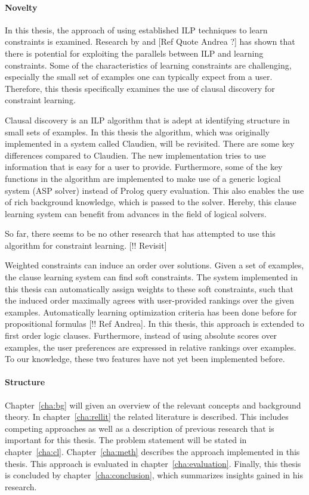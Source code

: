\paragraph{Novelty}
In this thesis, the approach of using established ILP techniques to learn constraints is examined. Research by \cite{Lallouet:LearningCP} and [Ref Quote Andrea ?] has shown that there is potential for exploiting the parallels between ILP and learning constraints. Some of the characteristics of learning constraints are challenging, especially the small set of examples one can typically expect from a user. Therefore, this thesis specifically examines the use of clausal discovery for constraint learning.

Clausal discovery is an ILP algorithm that is adept at identifying structure in small sets of examples. In this thesis the algorithm, which was originally implemented in a system called Claudien, will be revisited. There are some key differences compared to Claudien. The new implementation tries to use information that is easy for a user to provide. Furthermore, some of the key functions in the algorithm are implemented to make use of a generic logical system (ASP solver) instead of Prolog query evaluation. This also enables the use of rich background knowledge, which is passed to the solver. Hereby, this clause learning system can benefit from advances in the field of logical solvers.

So far, there seems to be no other research that has attempted to use this algorithm for constraint learning. [!! Revisit]

Weighted constraints can induce an order over solutions. Given a set of examples, the clause learning system can find soft constraints. The system implemented in this thesis can automatically assign weights to these soft constraints, such that the induced order maximally agrees with user-provided rankings over the given examples. Automatically learning optimization criteria has been done before for propositional formulas [!! Ref Andrea]. In this thesis, this approach is extended to first order logic clauses. Furthermore, instead of using absolute scores over examples, the user preferences are expressed in relative rankings over examples. To our knowledge, these two features have not yet been implemented before.

\paragraph{Structure}
Chapter~\ref{cha:bg} will given an overview of the relevant concepts and background theory. In chapter~\ref{cha:rellit} the related literature is described. This includes competing approaches as well as a description of previous research that is important for this thesis. The problem statement will be stated in chapter~\ref{cha:cl}. Chapter~\ref{cha:meth} describes the approach implemented in this thesis. This approach is evaluated in chapter~\ref{cha:evaluation}. Finally, this thesis is concluded by chapter~\ref{cha:conclusion}, which summarizes insights gained in his research.